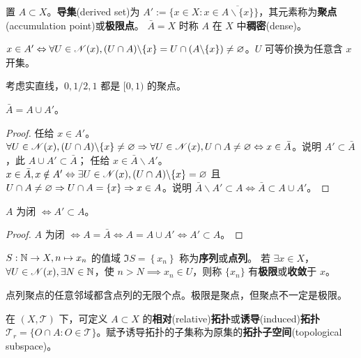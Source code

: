 \begin{definition}
置 $A\subset X$。\textbf{导集}(derived set)为 $A':=\{x \in X:x\in\overline{A\backslash\{x\}}\}$，其元素称为\textbf{聚点}(accumulation point)或\textbf{极限点}。
$\bar{A}=X$ 时称 $A$ 在 $X$ 中\textbf{稠密}(dense)。
\end{definition}
\begin{remark}
    $x\in A'\Leftrightarrow \forall U\in\mathscr N(x),(U\cap A)\backslash\{x\}=U\cap (A\backslash\{x\})\ne\varnothing$。$U$ 可等价换为任意含 $x$ 开集。
\end{remark}
\begin{eg}
    考虑实直线，$0,1/2,1$ 都是 $[0,1)$ 的聚点。
\end{eg}

\begin{theorem}
    $\bar A=A\cup A'$。  
\end{theorem}

\begin{proof}
    任给 $x\in A'$。$\forall U\in\mathscr N(x),(U\cap A)\backslash\{x\}\ne\varnothing\Rightarrow \forall U\in\mathscr N(x),U\cap A\ne\varnothing\Leftrightarrow x\in\bar A$。说明 $A'\subset \bar A$，此 $A\cup A'\subset\bar A$；
    任给 $x\in\bar A\backslash A'$。$x\in\bar A,x\notin A'\Leftrightarrow \exists U\in\mathscr N(x),(U\cap A)\backslash\{x\}=\varnothing$ 且 $U\cap A\ne\varnothing\Rightarrow U\cap A=\{x\}\Rightarrow x\in A$。说明 $\bar A\backslash A'\subset A\iff \bar A\subset A\cup A'$。
\end{proof}

\begin{theorem}
    $A$ 为闭 $\iff A'\subset A$。
\end{theorem}
\begin{proof}
    $A$ 为闭 $\iff A=\bar A\iff A=A\cup A'\iff A'\subset A$。
\end{proof}

\begin{definition}
    $S:\mathbb{N}\to X,n\mapsto x_n$ 的值域 $\Im S=\left\{x_n\right\}$ 称为\textbf{序列}或\textbf{点列}。
    若 $\exists x \in X$，$\forall U\in\mathscr N(x),\exists N\in\mathbb{N}$，使 $n>N\implies x_n\in U$，则称 $\{x_n\}$ 有\textbf{极限}或\textbf{收敛}于 $x$。
\end{definition}

\begin{remark}
    点列聚点的任意邻域都含点列的无限个点。极限是聚点，但聚点不一定是极限。
\end{remark}

\begin{definition}
    在 $(X,\mathscr T)$ 下，可定义 $A \subset X$ 的\textbf{相对}(relative)\textbf{拓扑}或\textbf{诱导}(induced)\textbf{拓扑} $\mathscr T_r=\{O \cap A: O\in\mathscr T\}$。赋予诱导拓扑的子集称为原集的\textbf{拓扑子空间}(topological subspace)。
\end{definition}

